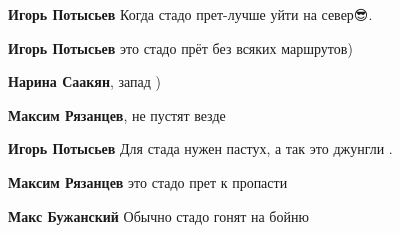 \begin{itemize}
\begin{itemize}
\textbf{Игорь Потысьев} Когда стадо прет-лучше уйти на север😎.

 
\textbf{Игорь Потысьев} это стадо прёт без всяких маршрутов)

 
\textbf{Нарина Саакян}, запад )

 
\textbf{Максим Рязанцев}, не пустят везде

 
\textbf{Игорь Потысьев} Для стада нужен пастух, а так это джунгли .

 
\textbf{Максим Рязанцев} это стадо прет к пропасти

 
\textbf{Макс Бужанский} Обычно стадо гонят на бойню

\end{itemize}

 


\end{itemize}
